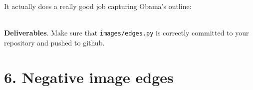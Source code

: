 It actually does a really good job capturing Obama's outline:\\
~\\

\begin{minipage}{\linewidth}
\end{minipage}

\begin{callout}{\bcplume}
{\bf Deliverables}. Make sure that {\tt images/edges.py} is correctly committed to your repository and pushed to github.
\end{callout}

\section{6. Negative image edges}

